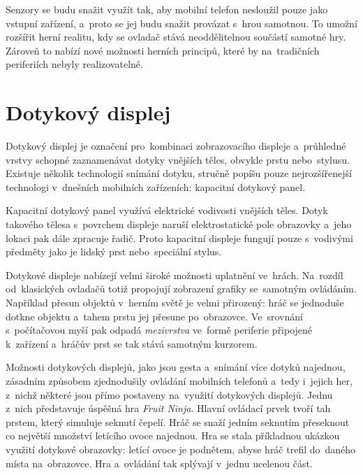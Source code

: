 \documentclass[thesis=B,czech,hidelinks]{FITthesis}[2012/06/26] %
\begin{document}
Senzory se budu snažit využít tak, aby mobilní telefon nesloužil pouze jako vstupní zařízení, a~proto se jej budu snažit provázat s~hrou samotnou. To umožní rozšířit herní realitu, kdy se ovladač stává neoddělitelnou součástí samotné hry. Zároveň to nabízí nové možnosti herních principů, které by na~tradičních periferiích nebyly realizovatelné.

\section{Dotykový displej}
\label{section:touchscreen}

Dotykový displej je označení pro~kombinaci zobrazovacího displeje a~průhledné vrstvy schopné zaznamenávat dotyky vnějších těles, obvykle prstu nebo~stylusu. Existuje několik technologií snímání dotyku, stručně popíšu pouze nejrozšířenejší technologi v~dnešních mobilních zařízeních: kapacitní dotykový panel.

Kapacitní dotykový panel využívá elektrické vodivosti vnějších těles. Dotyk takového tělesa s~povrchem displeje naruší elektrostatické pole obrazovky a~jeho lokaci pak dále zpracuje řadič. Proto kapacitní displeje fungují pouze s~vodivými předměty jako je lidský prst nebo~speciální stylus. \cite{gray2013does}

Dotykové displeje nabízejí velmi široké možnosti uplatnění ve~hrách. Na~rozdíl od~klasických ovladačů totiž propojují zobrazení grafiky se~samotným ovládáním. Například přesun objektů v~herním světě je velmi přirozený: hráč se jednoduše dotkne objektu a~tahem prstu jej přesune po~obrazovce. Ve~srovnání s~počítačovou myší pak odpadá \textit{mezivrstva} ve~formě periferie připojené k~zařízení a~hráčův prst se tak stává samotným kurzorem.

Možnosti dotykových displejů, jako jsou gesta a~snímání více dotyků najednou, zásadním způsobem zjednodušily ovládání mobilních telefonů a~tedy i~jejich her, z~nichž některé jsou přímo postaveny na~využití dotykových displejů. Jednu z~nich představuje úspěšná hra \textit{Fruit Ninja}\cite{fruitninja}.  Hlavní ovládací prvek tvoří tah prstem, který simuluje seknutí čepelí. Hráč se snaží jedním seknutím přeseknout co největší množství letícího ovoce najednou. Hra se stala příkladnou ukázkou využití dotykové obrazovky: letící ovoce je podnětem, abyse hráč trefil do~daného místa na~obrazovce. Hra a~ovládání tak splývají v~jednu ucelenou část.
\end{document}
